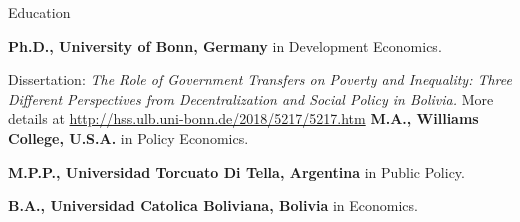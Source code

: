 \begin{rubric}{Education}

\entry*[2014 -- 2017]%
	\textbf{Ph.D., University of Bonn, Germany} in Development Economics.
	\par Dissertation: \emph{The Role of Government Transfers on Poverty and Inequality: Three Different Perspectives from Decentralization and Social Policy in Bolivia.} More details at \url{http://hss.ulb.uni-bonn.de/2018/5217/5217.htm}
%
\entry*[2011 -- 2012]%
	\textbf{M.A., Williams College, U.S.A.} in Policy Economics.\par
%
\entry*[2005 -- 2006]%
	\textbf{M.P.P., Universidad Torcuato Di Tella, Argentina} in Public Policy.\par
%

\entry*[1997 -- 2002]%
	\textbf{B.A., Universidad Catolica Boliviana, Bolivia} in Economics.\par
	
\end{rubric}